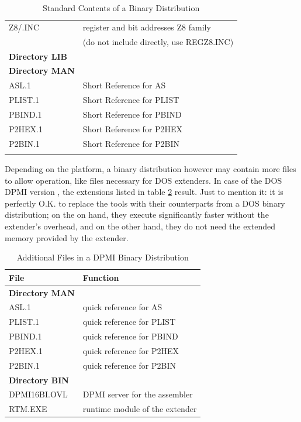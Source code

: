 \documentclass[12pt,twoside]{report}
\newcommand{\asname}{{AS}}
\begin{document}
\begin{center}
\begin{longtable}{|l|l|}
Z8/\*.INC         & register and bit addresses Z8 family \\
                  & (do not include directly, use REGZ8.INC) \\
\hline
{\bf Directory LIB} & \\
\hline
{\bf Directory MAN} & \\
\hline
ASL.1             & Short Reference for \asname{} \\
PLIST.1           & Short Reference for PLIST \\
PBIND.1           & Short Reference for PBIND \\
P2HEX.1           & Short Reference for P2HEX \\
P2BIN.1           & Short Reference for P2BIN \\
\hline
\caption{Standard Contents of a Binary Distribution
         \label{TabCommonPackageList}}
\end{longtable}\end{center}


Depending on the platform, a binary distribution however may contain more
files to allow operation, like files necessary for DOS extenders. In case
of the DOS DPMI version , the extensions listed in
table \ref{TabDPMIPackageList} result.  Just to mention it: it is
perfectly O.K. to replace the tools with their counterparts from a DOS
binary distribution; on the on hand, they execute significantly faster
without the extender's overhead, and on the other hand, they do not need
the extended memory provided by the extender.

\begin{table}[htp]
\begin{center}\begin{tabular}{|l|l|}
\hline
File              & Function \\
\hline
\hline
{\bf Directory MAN} & \\
\hline
ASL.1             & quick reference for \asname{} \\
PLIST.1           & quick reference for PLIST \\
PBIND.1           & quick reference for PBIND \\
P2HEX.1           & quick reference for P2HEX \\
P2BIN.1           & quick reference for P2BIN \\
\hline
\hline
{\bf Directory BIN} & \\
\hline
DPMI16BI.OVL   & DPMI server for the assembler \\
RTM.EXE        & runtime module of the extender \\
\hline
\end{tabular}\end{center}
\caption{Additional Files in a DPMI Binary Distribution
         \label{TabDPMIPackageList}}
\end{table}
\end{document}
